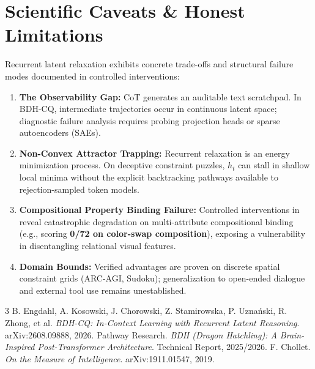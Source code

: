 \documentclass[9.5pt,a4paper]{article}
\begin{document}
\vspace{-0.45em}
\section{Scientific Caveats \& Honest Limitations}
\vspace{-0.25em}
Recurrent latent relaxation exhibits concrete trade-offs and structural failure modes documented in controlled interventions:
\begin{enumerate}
    \item \textbf{The Observability Gap:} CoT generates an auditable text scratchpad. In BDH-CQ, intermediate trajectories occur in continuous latent space; diagnostic failure analysis requires probing projection heads or sparse autoencoders (SAEs).
    \item \textbf{Non-Convex Attractor Trapping:} Recurrent relaxation is an energy minimization process. On deceptive constraint puzzles, $h_t$ can stall in shallow local minima without the explicit backtracking pathways available to rejection-sampled token models.
    \item \textbf{Compositional Property Binding Failure:} Controlled interventions in \cite{bdhcq2026} reveal catastrophic degradation on multi-attribute compositional binding (e.g., scoring \textbf{0/72 on color-swap composition}), exposing a vulnerability in disentangling relational visual features.
    \item \textbf{Domain Bounds:} Verified advantages are proven on discrete spatial constraint grids (ARC-AGI, Sudoku); generalization to open-ended dialogue and external tool use remains unestablished.
\end{enumerate}

\vspace{-0.55em}
\begin{thebibliography}{3}
\footnotesize
\setlength{\itemsep}{-1.0pt}
 B. Engdahl, A. Kosowski, J. Chorowski, Z. Stamirowska, P. Uzna\'nski, R. Zhong, et al. \textit{BDH-CQ: In-Context Learning with Recurrent Latent Reasoning}. arXiv:2608.09888, 2026.
 Pathway Research. \textit{BDH (Dragon Hatchling): A Brain-Inspired Post-Transformer Architecture}. Technical Report, 2025/2026.
 F. Chollet. \textit{On the Measure of Intelligence}. arXiv:1911.01547, 2019.
\end{thebibliography}
\end{document}
